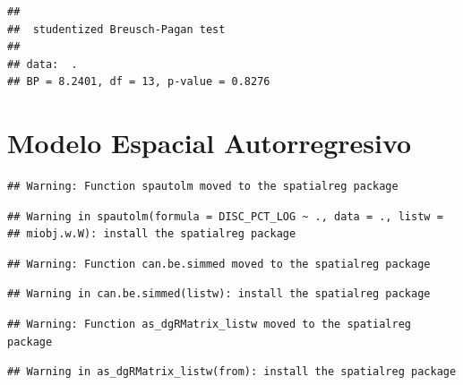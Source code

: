 \documentclass[11pt,]{article}
\newenvironment{Shaded}{\begin{snugshade}}{\end{snugshade}}
\newcommand{\KeywordTok}[1]{\textcolor[rgb]{0.13,0.29,0.53}{\textbf{#1}}}
\newcommand{\DataTypeTok}[1]{\textcolor[rgb]{0.13,0.29,0.53}{#1}}
\newcommand{\StringTok}[1]{\textcolor[rgb]{0.31,0.60,0.02}{#1}}
\newcommand{\OperatorTok}[1]{\textcolor[rgb]{0.81,0.36,0.00}{\textbf{#1}}}
\newcommand{\NormalTok}[1]{#1}
\begin{document}
\begin{verbatim}
## 
##  studentized Breusch-Pagan test
## 
## data:  .
## BP = 8.2401, df = 13, p-value = 0.8276
\end{verbatim}

\section{Modelo Espacial
Autorregresivo}\label{modelo-espacial-autorregresivo}

\begin{Shaded}
\end{Shaded}

\begin{verbatim}
## Warning: Function spautolm moved to the spatialreg package
\end{verbatim}

\begin{verbatim}
## Warning in spautolm(formula = DISC_PCT_LOG ~ ., data = ., listw =
## miobj.w.W): install the spatialreg package
\end{verbatim}

\begin{verbatim}
## Warning: Function can.be.simmed moved to the spatialreg package
\end{verbatim}

\begin{verbatim}
## Warning in can.be.simmed(listw): install the spatialreg package
\end{verbatim}

\begin{verbatim}
## Warning: Function as_dgRMatrix_listw moved to the spatialreg package
\end{verbatim}

\begin{verbatim}
## Warning in as_dgRMatrix_listw(from): install the spatialreg package
\end{verbatim}
\end{document}
